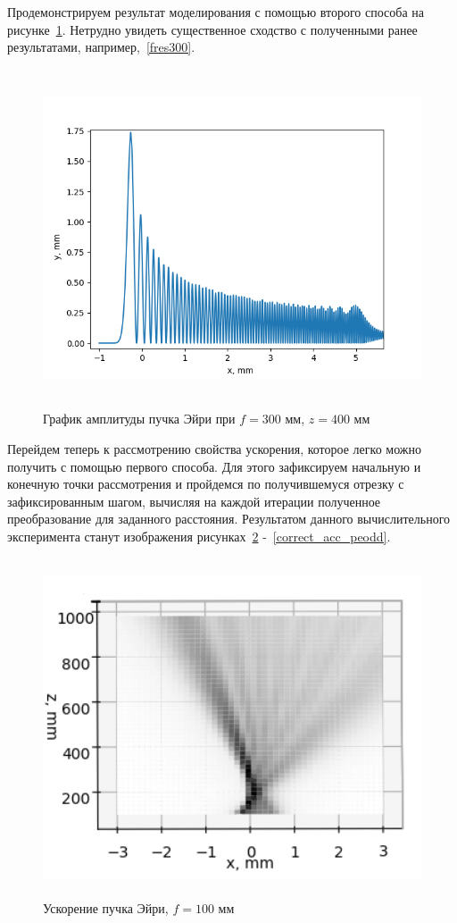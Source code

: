 {    Продемонстрируем результат моделирования с помощью второго способа на рисунке~\ref{four_fres_300_400}.
    Нетрудно увидеть существенное сходство с полученными ранее результатами, например,~\ref{fres300}.
    \begin{figure}[H]
        \centering
        \includegraphics[height = 10cm]{plots/four_fres_300_400.png}
        \caption{График амплитуды пучка Эйри при $f = 300$ мм, $z = 400$ мм}
        \label{four_fres_300_400}
    \end{figure}
    \vspace{0.5cm}

    Перейдем теперь к рассмотрению свойства ускорения, которое легко можно получить с помощью первого способа.
    Для этого зафиксируем начальную и конечную точки рассмотрения и пройдемся по получившемуся отрезку с зафиксированным шагом,
    вычисляя на каждой итерации полученное преобразование для заданного расстояния.
    Результатом данного вычислительного эксперимента станут изображения рисунках~\ref{correct_acc} -~\ref{correct_acc_peodd}.
    \begin{figure}[H]
        \centering
        \includegraphics[height = 10cm]{plots/ai_acc_before_focus.png}
        \caption{Ускорение пучка Эйри, $f = 100$ мм}
        \label{correct_acc}
    \end{figure}

}
